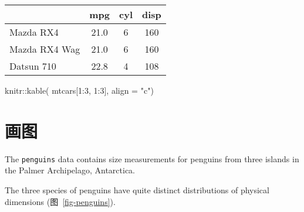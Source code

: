 \documentclass[
  1.2em,
  letterpaper,
]{scrbook}
\newenvironment{Shaded}{\begin{snugshade}}{\end{snugshade}}
\newcommand{\AttributeTok}[1]{\textcolor[rgb]{0.40,0.45,0.13}{#1}}
\newcommand{\DecValTok}[1]{\textcolor[rgb]{0.68,0.00,0.00}{#1}}
\newcommand{\FunctionTok}[1]{\textcolor[rgb]{0.28,0.35,0.67}{#1}}
\newcommand{\NormalTok}[1]{\textcolor[rgb]{0.00,0.23,0.31}{#1}}
\newcommand{\SpecialCharTok}[1]{\textcolor[rgb]{0.37,0.37,0.37}{#1}}
\newcommand{\StringTok}[1]{\textcolor[rgb]{0.13,0.47,0.30}{#1}}
\begin{document}
\begin{table*}

\begin{tabular}{lccc}
\toprule
 & mpg & cyl & disp\\
\midrule
Mazda RX4 & 21.0 & 6 & 160\\
Mazda RX4 Wag & 21.0 & 6 & 160\\
Datsun 710 & 22.8 & 4 & 108\\
\bottomrule
\end{tabular}

\end{table*}%

\begin{Shaded}
\begin{Highlighting}[]
\NormalTok{knitr}\SpecialCharTok{::}\FunctionTok{kable}\NormalTok{(}
\NormalTok{  mtcars[}\DecValTok{1}\SpecialCharTok{:}\DecValTok{3}\NormalTok{, }\DecValTok{1}\SpecialCharTok{:}\DecValTok{3}\NormalTok{], }\AttributeTok{align =} \StringTok{"c"}\NormalTok{)}
\end{Highlighting}
\end{Shaded}



\chapter{画图}\label{ux753bux56fe}

The \texttt{penguins} data contains size measurements for penguins from
three islands in the Palmer Archipelago, Antarctica.

The three species of penguins have quite distinct distributions of
physical dimensions (图~\ref{fig-penguins}).
\end{document}
